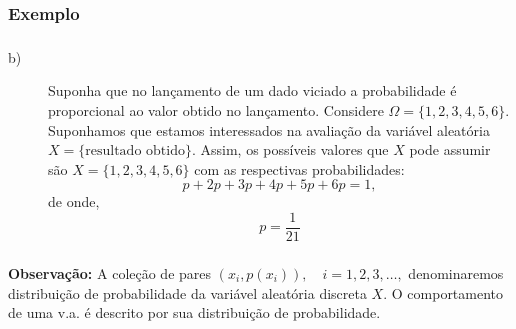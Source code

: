 \documentclass[14pt,aspectratio=1610]{beamer}
\begin{document}
\begin{frame}{}
\frametitle{Exemplo}
\begin{block}{}
\justifying
{}
\end{block}
\end{frame}

\begin{frame}{}
\frametitle{}
\begin{block}{}
\justifying
\begin{description}
\item[b)] Suponha que no lançamento de um dado viciado a probabilidade é proporcional ao valor obtido no lançamento. Considere $\Omega=\{1,2,3,4,5,6\}.$ Suponhamos que estamos interessados na avaliação da variável aleatória $X=\{\textrm{resultado obtido}\}.$ Assim, os possíveis valores que $X$ pode assumir são $X=\{1,2,3,4,5,6\}$ com as respectivas probabilidades: $$p+2p+3p+4p+5p+6p=1,$$ de onde, $$p=\dfrac{1}{21}$$
\end{description}
\end{block}
\end{frame}

\begin{frame}{}
\frametitle{}
\begin{block}{}
\justifying
\textbf{Observação:} A coleção de pares $(x_{i}, p(x_{i})),\quad i=1,2,3,\ldots,$ de\-no\-mi\-na\-re\-mos distribuição de probabilidade da variável aleatória discreta $X.$ 
O comportamento de uma v.a. é descrito por sua distribuição de probabilidade.
\end{block}
\end{frame}
\end{document}
